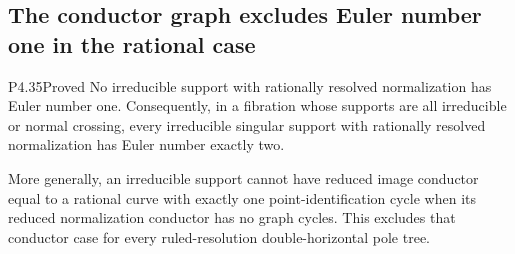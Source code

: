 \subsection{The conductor graph excludes Euler number one in the rational case}

\begin{statement}{P4.35}{Proved}
No irreducible support with rationally resolved normalization
has Euler number one. Consequently, in a fibration whose
supports are all irreducible or normal crossing, every
irreducible singular support with rationally resolved
normalization has Euler number exactly two.

More generally, an irreducible support cannot have reduced
image conductor equal to a rational curve with exactly one
point-identification cycle when its reduced normalization
conductor has no graph cycles. This excludes that conductor
case for every ruled-resolution double-horizontal pole tree.
\end{statement}
